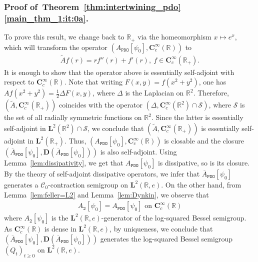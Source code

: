 \documentclass[12pt]{amsart}
\numberwithin{equation}{section}
\newcommand{\bb}{\mathbb}
\newcommand{\cc}{\mathcal}
\renewcommand{\ge}{\geqslant}
\newcommand{\ttt}{\mathtt}
\newcommand{\bmrm}[2][2]{\mathbf{#2}^{#1}}
\newcommand{\C}{\mathbf{C}}
\newcommand{\D}{\mathbf{D}}
\newcommand{\LRe}{\bmrm{L}(\bb{R},e)}
\theoremstyle{definition}
\theoremstyle{assump}
\theoremstyle{remark}
\begin{document}
{\subsubsection{Proof of~Theorem~\ref{thm:intertwining_pdo}\eqref{main_thm_1:it:0a}.} To prove this result, we change back to $\bb R_+$ via the homeomorphism $x\mapsto e^x$, which will transform the operator $(A_\ttt{PDO}[\psi_0],\C^\infty_c(\bb R))$ to
\begin{align*}
	\widetilde{A} f(r)=r f''(r)+f'(r), \ f\in\C^\infty_c(\bb R_+).
\end{align*}
It is enough to show that the operator above is essentially self-adjoint with respect to $\C^\infty_c(\bb R)$. Note that writing $F(x,y)=f(x^2+y^2)$, one has $Af(x^2+y^2)=\frac{1}{2}\Delta F(x,y)$, where $\Delta$ is the Laplacian on $\bb R^2$. Therefore, $(\widetilde{A},\C^\infty_c(\bb R_+))$ coincides with the operator $(\Delta,\mathbf{C}^\infty_c(\bb R^2)\cap\cc{S})$, where $\cc{S}$ is the set of all radially symmetric functions on $\bb R^2$. Since the latter is essentially self-adjoint in $\bmrm{L}(\bb R^2)\cap\cc{S}$, we conclude that $(\widetilde{A},\C^\infty_c(\bb R_+))$ is essentially self-adjoint in $\bmrm{L}(\bb R_+)$.
Thus, $(A_\ttt{PDO}[\psi_0],\C^\infty_c(\bb R))$ is closable and the closure $(\overline{A}_\ttt{PDO}[\psi_0],\D(\overline{A}_\ttt{PDO}[\psi_0]))$ is also self-adjoint. Using Lemma~\ref{lem:dissipativity}, we get that ${A}_\ttt{PDO}[\psi_0]$ is dissipative, so is its closure. By the  theory of self-adjoint dissipative operators, we infer that $\overline{A}_\ttt{PDO}[\psi_0]$ generates a $\cc{C}_0$-contraction semigroup on $\bmrm{L}(\bb{R},e)$. On the other hand, from Lemma~\ref{lem:feller=L2} and Lemma~\ref{lem:Dynkin}, we observe that
\begin{align*}
A_\ttt{2}[\psi_0]=A_\ttt{PDO}[\psi_0]  \textrm{ on  } \C^\infty_c(\bb{R})
\end{align*}
where $A_\ttt{2}[\psi_0]$ is the $\LRe$-generator of the log-squared Bessel semigroup. As $\C^\infty_c(\bb{R})$ is dense in $\bmrm{L}(\bb{R},e)$, by uniqueness, we conclude that $(\overline{A}_\ttt{PDO}[\psi_0],\D(\overline{A}_\ttt{PDO}[\psi_0]))$ generates the log-squared Bessel semigroup $(Q_t)_{t\ge 0}$ on $\bmrm{L}(\bb{R},e)$.

}
\end{document}
